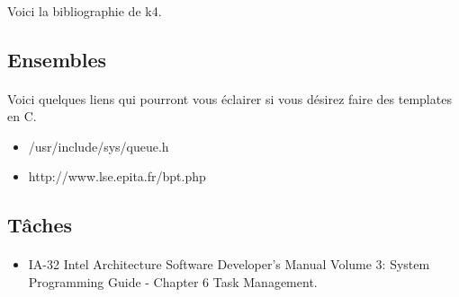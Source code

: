 \documentclass[10pt,a4wide]{article}
\begin{document}
\paragraph{}

Voici la bibliographie de k4.

\subsection{Ensembles}

\paragraph{}

Voici quelques liens qui pourront vous \'eclairer si vous d\'esirez
faire des templates en C.

\begin{itemize}
\item /usr/include/sys/queue.h
\item http://www.lse.epita.fr/bpt.php
\end{itemize}

\subsection{T\^aches}

\paragraph{}

\begin{itemize}
\item IA-32 Intel Architecture Software Developer's Manual Volume 3:
      System Programming Guide - Chapter 6 Task Management.
\end{itemize}
\end{document}
